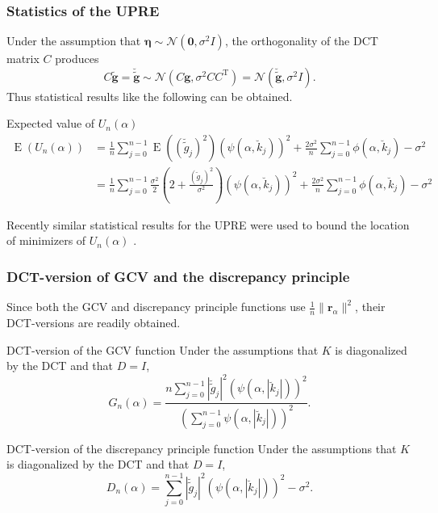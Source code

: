 \documentclass[t]{beamer}
\newcommand{\noise}{\eta}	%
\newcommand{\noiseSD}{\sigma}	%
\DeclareMathOperator{\E}{E}	%
\newcommand{\gVec}{\mathbf{g}}	%
\newcommand{\gnoise}{\widetilde{g}}	%
\newcommand{\gnoiseVec}{\widetilde{\mathbf{g}}}	%
\newcommand{\trans}{\mathrm{T}}	%
\newcommand{\noiseVec}{\mathbf{\noise}}	%
\newcommand{\dct}[1]{\breve{#1}}	%
\newcommand{\regparam}{\alpha}
\newcommand{\filt}{\phi}
\newcommand{\mfilt}{\psi}
\newcommand{\regres}{\mathbf{r}_{\regparam}}	%
\newcommand{\U}{U}	%
\newcommand{\GCV}{G}	%
\newcommand{\D}{D}	%
\begin{document}
\begin{frame}
\frametitle{Statistics of the UPRE}
Under the assumption that $\mathbf{\noiseVec} \sim \mathcal{N}(\mathbf{0},\noiseSD^2 I)$, the orthogonality of the DCT matrix $C$ produces
\[C\mathbf{\gnoiseVec} = \dct{\mathbf{\gnoiseVec}} \sim \mathcal{N}(C\mathbf{\gVec},\noiseSD^2 CC^\trans) = \mathcal{N}(\dct{\mathbf{\gnoiseVec}},\noiseSD^2 I).\]
Thus statistical results like the following can be obtained.
\begin{block}{Expected value of $\U_n(\regparam)$}
\begin{align*}
\E\left(\U_n(\regparam)\right) &= \frac{1}{n}\sum_{j = 0}^{n-1} \E\left((\dct{\gnoise}_j)^2\right)(\mfilt(\regparam,\dct{k}_j))^2 + \frac{2\noiseSD^2}{n}\sum_{j = 0}^{n-1} \filt(\regparam,\dct{k}_j) - \noiseSD^2 \\
&= \frac{1}{n}\sum_{j = 0}^{n-1} \frac{\noiseSD^2}{2}\left(2 + \frac{(\dct{g}_j)^2}{\noiseSD^2}\right)(\mfilt(\regparam,\dct{k}_j))^2 + \frac{2\noiseSD^2}{n}\sum_{j = 0}^{n-1} \filt(\regparam,\dct{k}_j) - \noiseSD^2
\end{align*}
\end{block}
Recently similar statistical results for the UPRE were used to bound the location of minimizers of $\U_n(\regparam)$ \cite{RenautHelmstetterVatankhah}.
\end{frame}

\begin{frame}
\frametitle{DCT-version of GCV and the discrepancy principle}
Since both the GCV and discrepancy principle functions use $\frac{1}{n}\|\regres\|^2$, their DCT-versions are readily obtained.
\begin{block}{DCT-version of the GCV function}
Under the assumptions that $K$ is diagonalized by the DCT and that $D = I$,
\[\GCV_n(\regparam) = \frac{n \sum_{j = 0}^{n-1} |\dct{\gnoise}_j|^2(\mfilt(\regparam,|\dct{k}_j|))^2}{(\sum_{j = 0}^{n-1} \mfilt(\regparam,|\dct{k}_j|))^2}.\]
\end{block}
\begin{block}{DCT-version of the discrepancy principle function}
Under the assumptions that $K$ is diagonalized by the DCT and that $D = I$,
\[\D_n(\regparam) = \sum_{j = 0}^{n-1} |\dct{\gnoise}_j|^2(\mfilt(\regparam,|\dct{k}_j|))^2 - \noiseSD^2.\]
\end{block}
\end{frame}
\end{document}
